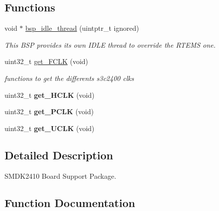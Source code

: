 \subsection*{Functions}
\begin{DoxyCompactItemize}
\item 
void $\ast$ \mbox{\hyperlink{group__RTEMSBSPsARMSMDK2410_ga301be7085b80c41a9c5887247003c662}{bsp\+\_\+idle\+\_\+thread}} (uintptr\+\_\+t ignored)
\begin{DoxyCompactList}\small\item\em This B\+SP provides its own I\+D\+LE thread to override the R\+T\+E\+MS one. \end{DoxyCompactList}\end{DoxyCompactItemize}
\begin{DoxyCompactItemize}
\item 
\mbox{\label{group__RTEMSBSPsARMSMDK2410_gab56a88aaed3e12f431d886a095a6106a}} 
uint32\+\_\+t \mbox{\hyperlink{group__RTEMSBSPsARMSMDK2410_gab56a88aaed3e12f431d886a095a6106a}{get\+\_\+\+F\+C\+LK}} (void)
\begin{DoxyCompactList}\small\item\em functions to get the differents s3c2400 clks \end{DoxyCompactList}\item 
\mbox{\label{group__RTEMSBSPsARMSMDK2410_ga246cbf7f95a83c60a64b412c5b0b5c25}} 
uint32\+\_\+t {\bfseries get\+\_\+\+H\+C\+LK} (void)
\item 
\mbox{\label{group__RTEMSBSPsARMSMDK2410_gab285fe3912fc1f5b4e762e7d57d817d4}} 
uint32\+\_\+t {\bfseries get\+\_\+\+P\+C\+LK} (void)
\item 
\mbox{\label{group__RTEMSBSPsARMSMDK2410_gaf7c72d3fa1a82d716c96b342e4b87987}} 
uint32\+\_\+t {\bfseries get\+\_\+\+U\+C\+LK} (void)
\end{DoxyCompactItemize}


\subsection{Detailed Description}
S\+M\+D\+K2410 Board Support Package. 



\subsection{Function Documentation}
\mbox{\label{group__RTEMSBSPsARMSMDK2410_ga301be7085b80c41a9c5887247003c662}} 
